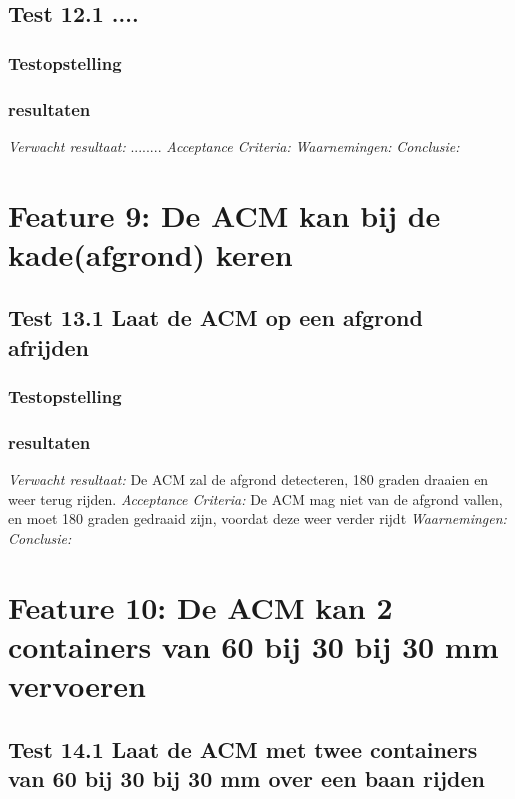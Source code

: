 \documentclass{article}
\begin{document}
\subsection{Test 12.1 ....}
\subsubsection{Testopstelling}
\subsubsection{resultaten}
\textit{Verwacht resultaat: } ........
\newline
\textit{Acceptance Criteria: }
\newline
\textit{Waarnemingen: }
\newline
\textit{Conclusie: }

\section{Feature 9: De ACM kan bij de kade(afgrond) keren}
\subsection{Test 13.1 Laat de ACM op een afgrond afrijden}
\subsubsection{Testopstelling}
\subsubsection{resultaten}
\textit{Verwacht resultaat: }De ACM zal de afgrond detecteren, 180 graden draaien en weer terug rijden.
\newline
\textit{Acceptance Criteria: }De ACM mag niet van de afgrond vallen, en moet 180 graden gedraaid zijn, voordat deze weer verder rijdt
\newline
\textit{Waarnemingen: }
\newline
\textit{Conclusie: }

\section{Feature 10: De ACM kan 2 containers van 60 bij 30 bij 30 mm vervoeren}

\subsection{Test 14.1 Laat de ACM met twee containers van 60 bij 30 bij 30 mm over een baan rijden}
\end{document}
